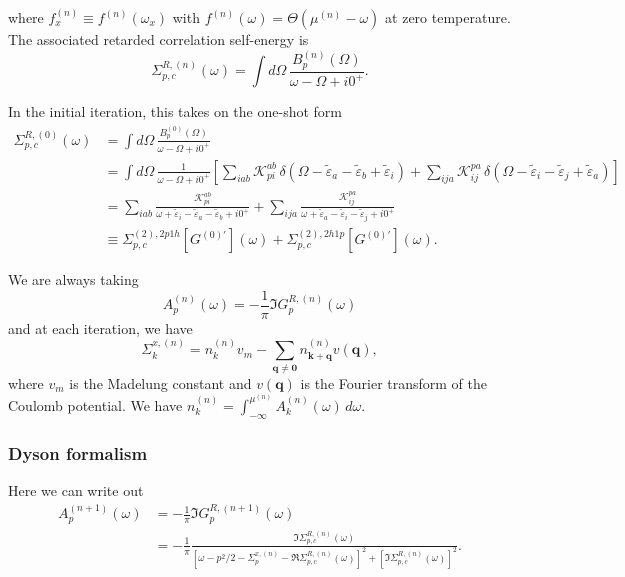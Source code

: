 where $
f_x^{(n)}
\equiv
f^{(n)}(\omega_x)$ with $f^{(n)}(\omega)
=
\Theta\!\left(\mu^{(n)}-\omega\right)$ at zero temperature.
The associated retarded correlation self-energy is
\begin{equation}
\Sigma_{p,c}^{R,(n)}(\omega)
=
\int d\Omega\,
\frac{B_p^{(n)}(\Omega)}
{\omega-\Omega+i0^+}.
\end{equation} 
\begin{tcolorbox}
In the initial iteration, this takes on the one-shot form 
\begin{align}
\Sigma_{p,c}^{R,(0)}(\omega)
&=
\int d\Omega\,
\frac{B_p^{(0)}(\Omega)}
{\omega-\Omega+i0^+}
\\
&=
\int d\Omega\,
\frac{1}{\omega-\Omega+i0^+}
\left[
\sum_{iab}
\mathcal K_{pi}^{ab}\,
\delta\!\left(
\Omega-\tilde{\varepsilon}_a-\tilde{\varepsilon}_b
+\tilde{\varepsilon}_i
\right)
+
\sum_{ija}
\mathcal K_{ij}^{pa}\,
\delta\!\left(
\Omega-\tilde{\varepsilon}_i-\tilde{\varepsilon}_j
+\tilde{\varepsilon}_a
\right)
\right]
\\
&=
\sum_{iab}
\frac{\mathcal K_{pi}^{ab}}
{\omega+\tilde{\varepsilon}_i
-\tilde{\varepsilon}_a-\tilde{\varepsilon}_b+i0^+}
+
\sum_{ija}
\frac{\mathcal K_{ij}^{pa}}
{\omega+\tilde{\varepsilon}_a
-\tilde{\varepsilon}_i-\tilde{\varepsilon}_j+i0^+}
\\
&\equiv
\Sigma_{p,c}^{(2),2p1h}
\!\left[G^{(0)'}\right](\omega)
+
\Sigma_{p,c}^{(2),2h1p}
\!\left[G^{(0)'}\right](\omega)
.
\end{align}
\end{tcolorbox}
We are always taking 
\begin{equation}
A_p^{(n)}(\omega)
=
-\frac{1}{\pi}
\Im
G_p^{R,(n)}(\omega)
\end{equation}
and at each iteration, we have
\begin{equation}
\Sigma_k^{x,(n)} = n_{k}^{(n)}v_m-\sum_{\bm{q}\neq\bm{0}} n_{\bm{k}+\bm{q}}^{(n)}v(\bm{q}),
\end{equation}
where $v_m$ is the Madelung constant and $v(\bm{q})$ is the Fourier transform of the Coulomb potential. We have $n_k^{(n)} = \int_{-\infty}^{\mu^{(n)}} A_k^{(n)}(\omega)\,d\omega$.
\subsubsection{Dyson formalism}
Here we can write out 
\begin{align}
A_p^{(n+1)}(\omega)
&=
-\frac{1}{\pi}
\Im G_p^{R,(n+1)}(\omega)
\\
&=
{
-\frac{1}{\pi}
\frac{
\Im\Sigma_{p,c}^{R,(n)}(\omega)
}{
\left[
\omega-p^2/2-\Sigma_p^{x,{(n)}}
-\Re\Sigma_{p,c}^{R,(n)}(\omega)
\right]^2
+
\left[
\Im\Sigma_{p,c}^{R,(n)}(\omega)
\right]^2
}
}.
\end{align}
